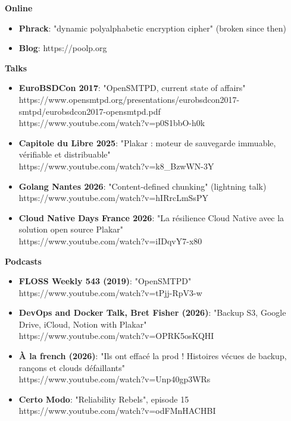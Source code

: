 \documentclass[a4paper,10pt]{letter}
\begin{document}
\textbf{Online}
\begin{itemize}
\item	\textbf{Phrack}: "dynamic polyalphabetic encryption cipher" (broken since then)
\item	\textbf{Blog}: https://poolp.org\\
\end{itemize}

\textbf{Talks}
\begin{itemize}
\item	\textbf{EuroBSDCon 2017}: "OpenSMTPD, current state of affairs"\\
  https://www.opensmtpd.org/presentations/eurobsdcon2017-smtpd/eurobsdcon2017-opensmtpd.pdf\\
  https://www.youtube.com/watch?v=p0S1bbO-h0k\\
\item	\textbf{Capitole du Libre 2025}: "Plakar : moteur de sauvegarde immuable, v\'erifiable et distribuable"\\
  https://www.youtube.com/watch?v=k8\_BzwWN-3Y\\
\item	\textbf{Golang Nantes 2026}: "Content-defined chunking" (lightning talk)\\
  https://www.youtube.com/watch?v=hIRrcLmSsPY\\
\item	\textbf{Cloud Native Days France 2026}: "La r\'esilience Cloud Native avec la solution open source Plakar"\\
  https://www.youtube.com/watch?v=iIDqvY7-x80\\
\end{itemize}

\textbf{Podcasts}
\begin{itemize}
\item	\textbf{FLOSS Weekly 543 (2019)}: "OpenSMTPD"\\
  https://www.youtube.com/watch?v=tPjj-RpV3-w\\
\item	\textbf{DevOps and Docker Talk, Bret Fisher (2026)}: "Backup S3, Google Drive, iCloud, Notion with Plakar"\\
  https://www.youtube.com/watch?v=OPRK5osKQHI\\
\item	\textbf{\`A la french (2026)}: "Ils ont effac\'e la prod ! Histoires v\'ecues de backup, ran\c{c}ons et clouds d\'efaillants"\\
  https://www.youtube.com/watch?v=Unp40gp3WRs\\
\item	\textbf{Certo Modo}: "Reliability Rebels", episode 15\\
  https://www.youtube.com/watch?v=odFMnHACHBI\\
\end{itemize}
\end{document}

